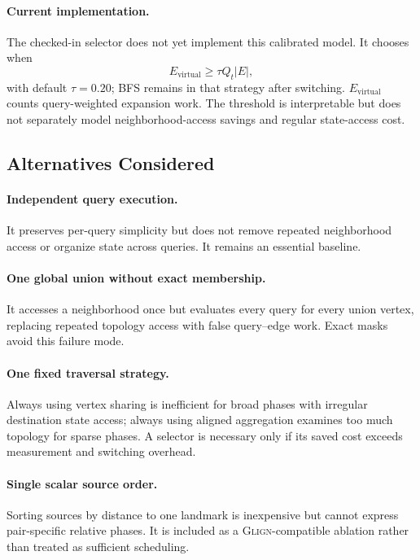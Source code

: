 \paragraph{Current implementation.}
The checked-in selector does not yet implement this calibrated model.  It chooses \coalescedgather when
\begin{equation}
 E_{\mathrm{virtual}} \geq \tau Q_t|E|,
\end{equation}
with default $\tau=0.20$; BFS remains in that strategy after switching.  $E_{\mathrm{virtual}}$ counts query-weighted expansion work.  The threshold is interpretable but does not separately model neighborhood-access savings and regular state-access cost.  

\subsection{Alternatives Considered}

\paragraph{Independent query execution.}
It preserves per-query simplicity but does not remove repeated neighborhood access or organize state across queries.  It remains an essential baseline.

\paragraph{One global union without exact membership.}
It accesses a neighborhood once but evaluates every query for every union vertex, replacing repeated topology access with false query--edge work.  Exact masks avoid this failure mode.

\paragraph{One fixed traversal strategy.}
Always using vertex sharing is inefficient for broad phases with irregular destination state access; always using aligned aggregation examines too much topology for sparse phases.  A selector is necessary only if its saved cost exceeds measurement and switching overhead.

\paragraph{Single scalar source order.}
Sorting sources by distance to one landmark is inexpensive but cannot express pair-specific relative phases.  It is included as a \textsc{Glign}-compatible ablation rather than treated as sufficient scheduling.

